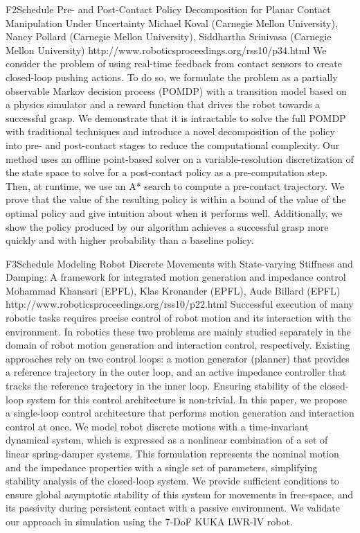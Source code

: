 \begin{spacing}{1.0}
\descriptionPaper
{F2}{Schedule}
{	
Pre- and Post-Contact Policy Decomposition for Planar Contact Manipulation Under Uncertainty 
}
{
Michael Koval (Carnegie Mellon University), Nancy Pollard (Carnegie Mellon University), Siddhartha Srinivasa (Carnegie Mellon University)
}
{
http://www.roboticsproceedings.org/rss10/p34.html
}
{
We consider the problem of using real-time feedback from contact sensors to create closed-loop pushing actions. To do so, we formulate the problem as a partially observable Markov decision process (POMDP) with a transition model based on a physics simulator and a reward function that drives the robot towards a successful grasp. We demonstrate that it is intractable to solve the full POMDP with traditional techniques and introduce a novel decomposition of the policy into pre- and post-contact stages to reduce the computational complexity. Our method uses an offline point-based solver on a variable-resolution discretization of the state space to solve for a post-contact policy as a pre-computation step. Then, at runtime, we use an A* search to compute a pre-contact trajectory. We prove that the value of the resulting policy is within a bound of the value of the optimal policy and give intuition about when it performs well. Additionally, we show the policy produced by our algorithm achieves a successful grasp more quickly and with higher probability than a baseline policy.
}





\descriptionPaper
{F3}{Schedule}
{	
Modeling Robot Discrete Movements with State-varying Stiffness and Damping: A framework for integrated motion generation and impedance control 
}
{
Mohammad Khansari (EPFL), Klas Kronander (EPFL), Aude Billard (EPFL)
}
{
http://www.roboticsproceedings.org/rss10/p22.html
}
{
Successful execution of many robotic tasks requires precise control of robot motion and its interaction with the environment. In robotics these two problems are mainly studied separately in the domain of robot motion generation and interaction control, respectively. Existing approaches rely on two control loops: a motion generator (planner) that provides a reference trajectory in the outer loop, and an active impedance controller that tracks the reference trajectory in the inner loop. Ensuring stability of the closed-loop system for this control architecture is non-trivial. In this paper, we propose a single-loop control architecture that performs motion generation and interaction control at once. We model robot discrete motions with a time-invariant dynamical system, which is expressed as a nonlinear combination of a set of linear spring-damper systems. This formulation represents the nominal motion and the impedance properties with a single set of parameters, simplifying stability analysis of the closed-loop system. We provide sufficient conditions to ensure global asymptotic stability of this system for movements in free-space, and its passivity during persistent contact with a passive environment. We validate our approach in simulation using the 7-DoF KUKA LWR-IV robot.
}




\end{spacing}
